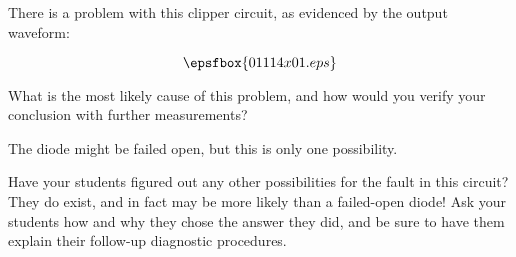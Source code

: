 

There is a problem with this clipper circuit, as evidenced by the output waveform:

$$\epsfbox{01114x01.eps}$$

What is the most likely cause of this problem, and how would you verify your conclusion with further measurements?







The diode might be failed open, but this is only one possibility.







Have your students figured out any other possibilities for the fault in this circuit?  They do exist, and in fact may be more likely than a failed-open diode!  Ask your students how and why they chose the answer they did, and be sure to have them explain their follow-up diagnostic procedures.




